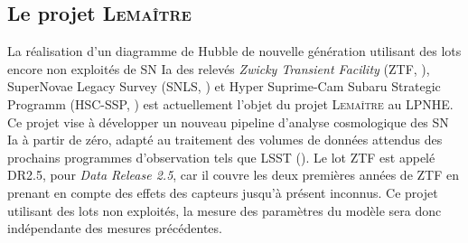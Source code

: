 \documentclass{book}
\def\lemaitre{\textsc{Lemaître}\xspace}
\begin{document}
\subsection{Le projet \lemaitre}

 La réalisation d'un diagramme de Hubble de nouvelle génération utilisant des lots encore non exploités de SN Ia des relevés \textit{Zwicky Transient Facility} (ZTF, \cite{bellm_zwicky_2018}), SuperNovae Legacy Survey (SNLS, \cite{pritchet_snls_2004}) et Hyper Suprime-Cam Subaru Strategic Programm (HSC-SSP, \cite{miyazaki_hyper_2012,aihara_hyper_2018}) est actuellement l’objet du projet \lemaitre au LPNHE. Ce projet vise à développer un nouveau pipeline d'analyse cosmologique des SN Ia à partir de zéro, adapté au traitement des volumes de données attendus des prochains programmes d’observation tels que LSST (\cite{the_lsst_dark_energy_science_collaboration_lsst_2021}). Le lot ZTF est appelé DR2.5, pour \textit{Data Release 2.5}, car il couvre les deux premières années de ZTF en prenant en compte des effets des capteurs jusqu'à présent inconnus. Ce projet utilisant des lots non exploités, la mesure des paramètres du modèle sera donc indépendante des mesures précédentes.
\end{document}
